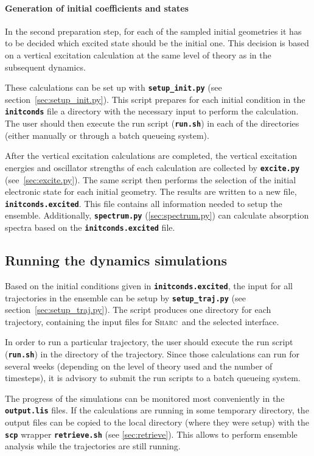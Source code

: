 \documentclass[a4paper,11pt,DIV=15,openany,twoside=false]{scrbook}
\newcommand{\sharc}{\textsc{Sharc}}
\newcommand{\ttt}[1]{\textbf{\texttt{#1}}}
\begin{document}
\paragraph{Generation of initial coefficients and states}

In the second preparation step, for each of the sampled initial geometries it has to be decided which excited state should be the initial one. This decision is based on a vertical excitation calculation at the same level of theory as in the subsequent dynamics. 

These calculations can be set up with \ttt{setup\_init.py} (see section~\ref{sec:setup_init.py}). This script prepares for each initial condition in the \ttt{initconds} file a directory with the necessary input to perform the calculation. The user should then execute the run script (\ttt{run.sh}) in each of the directories (either manually or through a batch queueing system).

After the vertical excitation calculations are completed, the vertical excitation energies and oscillator strengths of each calculation are collected by \ttt{excite.py} (see~\ref{sec:excite.py}). The same script then performs the selection of the initial electronic state for each initial geometry. The results are written to a new file, \ttt{initconds.excited}. This file contains all information needed to setup the ensemble. Additionally, \ttt{spectrum.py} (\ref{sec:spectrum.py}) can calculate absorption spectra based on the \ttt{initconds.excited} file.

\subsection{Running the dynamics simulations}

Based on the initial conditions given in \ttt{initconds.excited}, the input for all trajectories in the ensemble can be setup by \ttt{setup\_traj.py} (see section~\ref{sec:setup_traj.py}). The script produces one directory for each trajectory, containing the input files for \sharc\ and the selected interface.

In order to run a particular trajectory, the user should execute the run script (\ttt{run.sh}) in the directory of the trajectory. Since those calculations can run for several weeks (depending on the level of theory used and the number of timesteps), it is advisory to submit the run scripts to a batch queueing system. 

The progress of the simulations can be monitored most conveniently in the \ttt{output.lis} files. If the calculations are running in some temporary directory, the output files can be copied to the local directory (where they were setup) with the \ttt{scp} wrapper \ttt{retrieve.sh} (see \ref{sec:retrieve}). This allows to perform ensemble analysis while the trajectories are still running.
\end{document}
